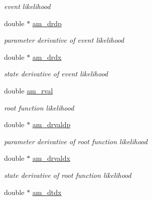 \begin{DoxyCompactItemize}
\begin{DoxyCompactList}\small\item\em event likelihood \end{DoxyCompactList}\item 
\hypertarget{struct_temp_data_af40e5e8e0a65436934e4f2888340e458}{}double $\ast$ \hyperlink{struct_temp_data_af40e5e8e0a65436934e4f2888340e458}{am\+\_\+drdp}\label{struct_temp_data_af40e5e8e0a65436934e4f2888340e458}

\begin{DoxyCompactList}\small\item\em parameter derivative of event likelihood \end{DoxyCompactList}\item 
\hypertarget{struct_temp_data_a0fb069ba24e8e90df621dd29ec4c84f7}{}double $\ast$ \hyperlink{struct_temp_data_a0fb069ba24e8e90df621dd29ec4c84f7}{am\+\_\+drdx}\label{struct_temp_data_a0fb069ba24e8e90df621dd29ec4c84f7}

\begin{DoxyCompactList}\small\item\em state derivative of event likelihood \end{DoxyCompactList}\item 
\hypertarget{struct_temp_data_a64ffad68a060a30c8a0c665c65784dfc}{}double \hyperlink{struct_temp_data_a64ffad68a060a30c8a0c665c65784dfc}{am\+\_\+rval}\label{struct_temp_data_a64ffad68a060a30c8a0c665c65784dfc}

\begin{DoxyCompactList}\small\item\em root function likelihood \end{DoxyCompactList}\item 
\hypertarget{struct_temp_data_aeb64dd8f56bebc4a6228eec5c4131aad}{}double $\ast$ \hyperlink{struct_temp_data_aeb64dd8f56bebc4a6228eec5c4131aad}{am\+\_\+drvaldp}\label{struct_temp_data_aeb64dd8f56bebc4a6228eec5c4131aad}

\begin{DoxyCompactList}\small\item\em parameter derivative of root function likelihood \end{DoxyCompactList}\item 
\hypertarget{struct_temp_data_acdc5967fa5a5aab617a1e41269f57935}{}double $\ast$ \hyperlink{struct_temp_data_acdc5967fa5a5aab617a1e41269f57935}{am\+\_\+drvaldx}\label{struct_temp_data_acdc5967fa5a5aab617a1e41269f57935}

\begin{DoxyCompactList}\small\item\em state derivative of root function likelihood \end{DoxyCompactList}\item 
\hypertarget{struct_temp_data_a5fea9eb6e03adbeb2e5c613f00078200}{}double $\ast$ \hyperlink{struct_temp_data_a5fea9eb6e03adbeb2e5c613f00078200}{am\+\_\+dtdx}\label{struct_temp_data_a5fea9eb6e03adbeb2e5c613f00078200}


\end{DoxyCompactItemize}
